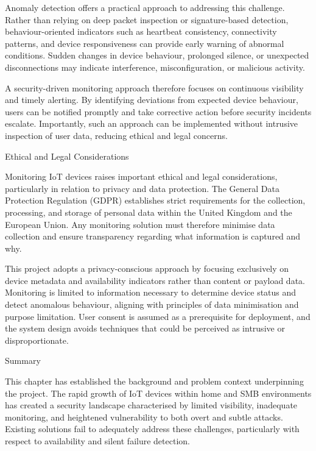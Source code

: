 Anomaly detection offers a practical approach to addressing this challenge. Rather than relying on deep packet inspection or signature-based detection, behaviour-oriented indicators such as heartbeat consistency, connectivity patterns, and device responsiveness can provide early warning of abnormal conditions. Sudden changes in device behaviour, prolonged silence, or unexpected disconnections may indicate interference, misconfiguration, or malicious activity.

A security-driven monitoring approach therefore focuses on continuous visibility and timely alerting. By identifying deviations from expected device behaviour, users can be notified promptly and take corrective action before security incidents escalate. Importantly, such an approach can be implemented without intrusive inspection of user data, reducing ethical and legal concerns.

Ethical and Legal Considerations

Monitoring IoT devices raises important ethical and legal considerations, particularly in relation to privacy and data protection. The General Data Protection Regulation (GDPR) establishes strict requirements for the collection, processing, and storage of personal data within the United Kingdom and the European Union. Any monitoring solution must therefore minimise data collection and ensure transparency regarding what information is captured and why.

This project adopts a privacy-conscious approach by focusing exclusively on device metadata and availability indicators rather than content or payload data. Monitoring is limited to information necessary to determine device status and detect anomalous behaviour, aligning with principles of data minimisation and purpose limitation. User consent is assumed as a prerequisite for deployment, and the system design avoids techniques that could be perceived as intrusive or disproportionate.

Summary

This chapter has established the background and problem context underpinning the project. The rapid growth of IoT devices within home and SMB environments has created a security landscape characterised by limited visibility, inadequate monitoring, and heightened vulnerability to both overt and subtle attacks. Existing solutions fail to adequately address these challenges, particularly with respect to availability and silent failure detection.

